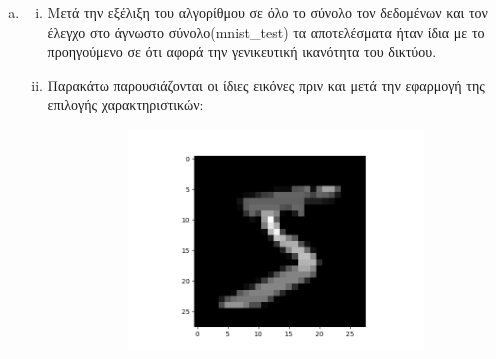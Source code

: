 \documentclass[12pt,a4paper]{article}
\newcommand{\tl}{\textlatin}
\begin{document}
\begin{enumerate}[a)]
\begin{enumerate}[i.]
                    \end{enumerate}
                \item

                            \begin{enumerate}[i.]
                                \item Μετά την εξέλιξη του αλγορίθμου σε όλο το
                                    σύνολο τον δεδομένων και τον έλεγχο στο
                                    άγνωστο σύνολο(\tl{mnist\_test}) τα
                                    αποτελέσματα ήταν ίδια με το προηγούμενο σε
                                    ότι αφορά την γενικευτική ικανότητα του
                                    δικτύου.
                                \item Παρακάτω παρουσιάζονται οι ίδιες εικόνες πριν και μετά
                                    την εφαρμογή της επιλογής χαρακτηριστικών: 
                            \begin{figure}[H]
                                \begin{subfigure}{0.5\textwidth}
                                    \raggedleft
                                    \includegraphics[width=\textwidth]{images/im7.png}
                                \end{subfigure}
                                \begin{subfigure}{0.5\textwidth}
                                    \raggedleft

\end{subfigure}
\end{figure}
\end{enumerate}
\end{enumerate}
\end{document}
